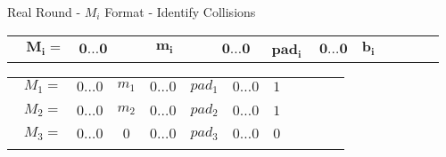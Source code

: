 \begin{frame}{Real Round - $M_i$ Format - Identify Collisions}

{\begin{table}[]
\centering
\begin{tabular}{c|c|c|c|c|c|c|llll}
\cline{2-7}
$\, \ \ \ \mathbf{M_i = }$ & $\mathbf{0 \dotsc 0}$ & $\, \ \qquad \mathbf{m_i} \, \ \qquad$ & $\mathbf{0 \dotsc 0}$ & \ $\mathbf{pad_i} \ $ & $\mathbf{0 \dotsc 0}$ & $\mathbf{b_i}$ &  &  &  &  \\ \cline{2-7}
\end{tabular}
\end{table}}

{\centering
\begin{tabular}{ccccccrllll}
\cline{2-7}
\multicolumn{1}{c|}{$\ \ \ M_1 = $}      & \multicolumn{1}{c|}{$0 \dotsc 0$} & \multicolumn{1}{c|}{$m_1$}             & \multicolumn{1}{c|}{$0 \dotsc 0$} & \multicolumn{1}{c|}{$pad_1$}    & \multicolumn{1}{c|}{$0 \dotsc 0$} & \multicolumn{1}{r|}{$1$}  &  &  &  &  \\ \cline{2-7}
                                   &                                   &                                        &                                   &                                 &                                   &                           &  &  &  &  \\ \cline{2-7}
\multicolumn{1}{c|}{$\ \ \ M_2 = $}     & \multicolumn{1}{c|}{$0 \dotsc 0$} & \multicolumn{1}{c|}{$m_2$}             & \multicolumn{1}{c|}{$0 \dotsc 0$} & \multicolumn{1}{c|}{$pad_2$}    & \multicolumn{1}{c|}{$0 \dotsc 0$} & \multicolumn{1}{r|}{$1$}  &  &  &  &  \\ \cline{2-7}
                                   &                                   &                                        &                                   &                                 &                                   &                           &  &  &  &  \\ \cline{2-7}
\multicolumn{1}{c|}{$\ \ \ M_3 = $}      & \multicolumn{1}{c|}{$0 \dotsc 0$} & \multicolumn{1}{c|}{$0$}               & \multicolumn{1}{c|}{$0 \dotsc 0$} & \multicolumn{1}{c|}{$pad_3$}    & \multicolumn{1}{c|}{$0 \dotsc 0$} & \multicolumn{1}{r|}{$0$}  &  &  &  &  \\ \cline{2-7}
                                   &                                   &                                        &                                   &                                 &                                   &                           &  &  &  &  \\ \cline{2-7}

\end{tabular}}
\end{frame}
